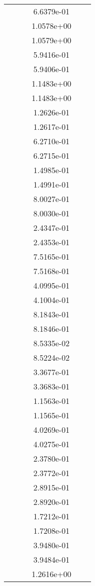 \begin{xltabular}{\textwidth}{r|rS[table-format=1.3e+2]S[table-format=1.4e+2]S[table-format=1.4e+2]S[table-format=-1.5]}
&  &  & 6.6379e-01 & & \\
&  &  & 1.0578e+00 & & \\
&  &  & 1.0579e+00 & & \\
&  &  & 5.9416e-01 & & \\
&  &  & 5.9406e-01 & & \\
&  &  & 1.1483e+00 & & \\
&  &  & 1.1483e+00 & & \\
&  &  & 1.2626e-01 & & \\
&  &  & 1.2617e-01 & & \\
&  &  & 6.2710e-01 & & \\
&  &  & 6.2715e-01 & & \\
&  &  & 1.4985e-01 & & \\
&  &  & 1.4991e-01 & & \\
&  &  & 8.0027e-01 & & \\
&  &  & 8.0030e-01 & & \\
&  &  & 2.4347e-01 & & \\
&  &  & 2.4353e-01 & & \\
&  &  & 7.5165e-01 & & \\
&  &  & 7.5168e-01 & & \\
&  &  & 4.0995e-01 & & \\
&  &  & 4.1004e-01 & & \\
&  &  & 8.1843e-01 & & \\
&  &  & 8.1846e-01 & & \\
&  &  & 8.5335e-02 & & \\
&  &  & 8.5224e-02 & & \\
&  &  & 3.3677e-01 & & \\
&  &  & 3.3683e-01 & & \\
&  &  & 1.1563e-01 & & \\
&  &  & 1.1565e-01 & & \\
&  &  & 4.0269e-01 & & \\
&  &  & 4.0275e-01 & & \\
&  &  & 2.3780e-01 & & \\
&  &  & 2.3772e-01 & & \\
&  &  & 2.8915e-01 & & \\
&  &  & 2.8920e-01 & & \\
&  &  & 1.7212e-01 & & \\
&  &  & 1.7208e-01 & & \\
&  &  & 3.9480e-01 & & \\
&  &  & 3.9484e-01 & & \\
&  &  & 1.2616e+00 & & \\

\end{xltabular}
